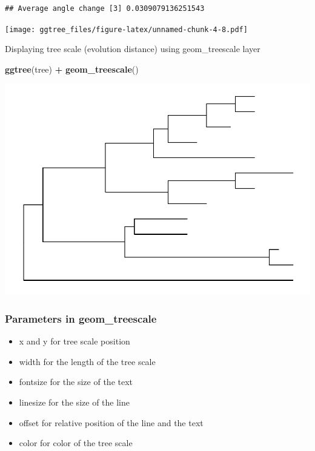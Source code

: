 \documentclass[]{article}
\newenvironment{Shaded}{\begin{snugshade}}{\end{snugshade}}
\newcommand{\KeywordTok}[1]{\textcolor[rgb]{0.13,0.29,0.53}{\textbf{#1}}}
\newcommand{\StringTok}[1]{\textcolor[rgb]{0.31,0.60,0.02}{#1}}
\newcommand{\OperatorTok}[1]{\textcolor[rgb]{0.81,0.36,0.00}{\textbf{#1}}}
\newcommand{\NormalTok}[1]{#1}
\providecommand{\tightlist}{%
  \setlength{\itemsep}{0pt}\setlength{\parskip}{0pt}}
\begin{document}
\begin{verbatim}
## Average angle change [3] 0.0309079136251543
\end{verbatim}

\texttt{[image: ggtree\_files/figure-latex/unnamed-chunk-4-8.pdf]}

Displaying tree scale (evolution distance) using geom\_treescale layer

\begin{Shaded}
\begin{Highlighting}[]
\KeywordTok{ggtree}\NormalTok{(tree) }\OperatorTok{+}\StringTok{ }\KeywordTok{geom_treescale}\NormalTok{()}
\end{Highlighting}
\end{Shaded}

\includegraphics{ggtree_files/figure-latex/unnamed-chunk-5-1.pdf}

\subsubsection{Parameters in
geom\_treescale}\label{parameters-in-geom_treescale}

\begin{itemize}
\tightlist
\item
  x and y for tree scale position
\item
  width for the length of the tree scale
\item
  fontsize for the size of the text
\item
  linesize for the size of the line
\item
  offset for relative position of the line and the text
\item
  color for color of the tree scale
\end{itemize}
\end{document}
